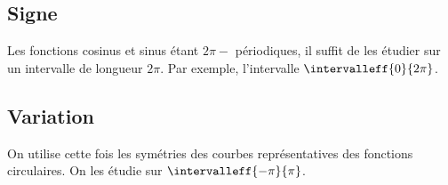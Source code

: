\documentclass[10pt,openright,twoside,french]{book}
\begin{document}
\subsection{Signe}

Les fonctions cosinus et sinus étant $2\pi-$ périodiques, il suffit de les étudier sur un intervalle de longueur $2\pi$. Par exemple, l'intervalle $\intervalleff{0}{2\pi}$.

\subsection{Variation}

On utilise cette fois les symétries des courbes représentatives des fonctions circulaires. On les étudie sur $\intervalleff{-\pi}{\pi}$.
\end{document}
